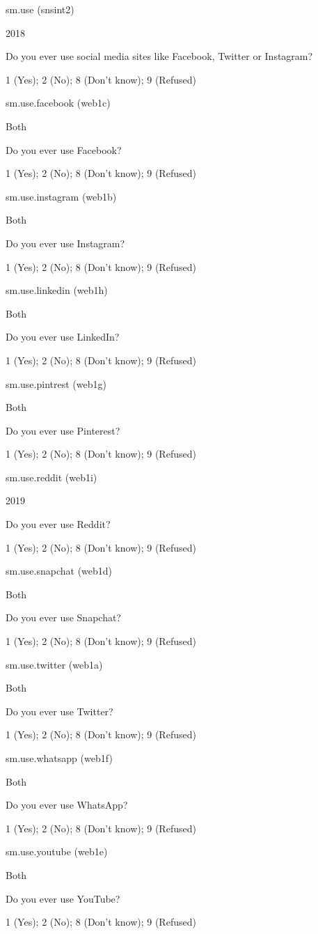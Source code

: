 \documentclass[]{book}
\begin{document}
sm.use (snsint2)

2018

Do you ever use social media sites like Facebook, Twitter or Instagram?

1 (Yes); 2 (No); 8 (Don't know); 9 (Refused)

sm.use.facebook (web1c)

Both

Do you ever use Facebook?

1 (Yes); 2 (No); 8 (Don't know); 9 (Refused)

sm.use.instagram (web1b)

Both

Do you ever use Instagram?

1 (Yes); 2 (No); 8 (Don't know); 9 (Refused)

sm.use.linkedin (web1h)

Both

Do you ever use LinkedIn?

1 (Yes); 2 (No); 8 (Don't know); 9 (Refused)

sm.use.pintrest (web1g)

Both

Do you ever use Pinterest?

1 (Yes); 2 (No); 8 (Don't know); 9 (Refused)

sm.use.reddit (web1i)

2019

Do you ever use Reddit?

1 (Yes); 2 (No); 8 (Don't know); 9 (Refused)

sm.use.snapchat (web1d)

Both

Do you ever use Snapchat?

1 (Yes); 2 (No); 8 (Don't know); 9 (Refused)

sm.use.twitter (web1a)

Both

Do you ever use Twitter?

1 (Yes); 2 (No); 8 (Don't know); 9 (Refused)

sm.use.whatsapp (web1f)

Both

Do you ever use WhatsApp?

1 (Yes); 2 (No); 8 (Don't know); 9 (Refused)

sm.use.youtube (web1e)

Both

Do you ever use YouTube?

1 (Yes); 2 (No); 8 (Don't know); 9 (Refused)
\end{document}
